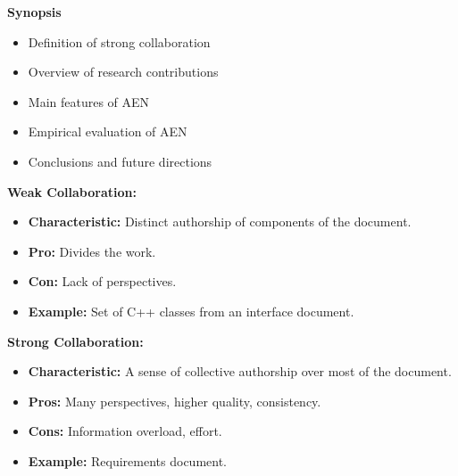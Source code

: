 \begin{slide} \Huge 
  {\bf Synopsis} \horizontalline
  \begin{itemize}\huge
  \item{Definition of strong collaboration}
  \item{Overview of research contributions}
  \item{Main features of  AEN}
  \item{Empirical evaluation of AEN}
  \item{Conclusions and future directions}
  \end{itemize}

\end{slide} \Huge   


\begin{slide}\Huge 
  {\bf Weak Collaboration:}
  \horizontalline\\
  \begin{itemize}\huge
  \item {\bf Characteristic:} Distinct authorship of components of the
    document.  
  \item {\bf Pro:} Divides the work.

  \item {\bf Con:}  Lack of perspectives.

  \item {\bf Example:} Set of C++ classes from an interface document.
  \end{itemize}

\end{slide}

\begin{slide}\Huge 
  {\bf Strong Collaboration:}
  \horizontalline
  \begin{itemize}\huge
  \item {\bf Characteristic:} A sense of collective authorship over most of the
    document.
  \item {\bf Pros:}  Many perspectives, higher quality, consistency.

  \item {\bf Cons:}  Information overload, effort.

  \item {\bf Example:} Requirements document.
  \end{itemize}

\end{slide}

